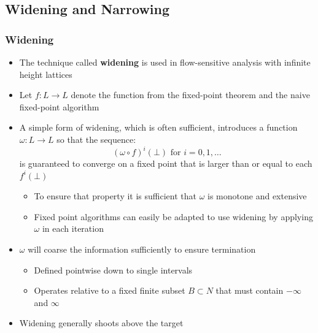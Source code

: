 \subsection{Widening and Narrowing}
\subsubsection{Widening}
\begin{itemize}
	\item The technique called \textbf{widening} is used in flow-sensitive analysis with infinite height lattices
  \item Let $f: L \to L$ denote the function from the fixed-point theorem and the naive fixed-point algorithm
  \item A simple form of widening, which is often sufficient, introduces a function $\omega : L \to L$ so that the sequence:
\begin{equation*}
	(\omega \circ f)^i(\bot) \text{ for } i = 0,1,\dots 
\end{equation*}
  is guaranteed to converge on a fixed point that is larger than or equal to each $f^i(\bot)$
  \begin{itemize}
	  \item To ensure that property it is sufficient that $\omega$ is monotone and extensive
	  \item Fixed point algorithms can easily be adapted to use widening by applying $\omega$ in each iteration
  \end{itemize}
  \item $\omega$ will coarse the information sufficiently to ensure termination
  \begin{itemize}
    \item Defined pointwise down to single intervals
    \item Operates relative to a fixed finite subset $B \subset N$ that must contain $- \infty$ and $\infty$
  \end{itemize}
  \item Widening generally shoots above the target
\end{itemize} 

